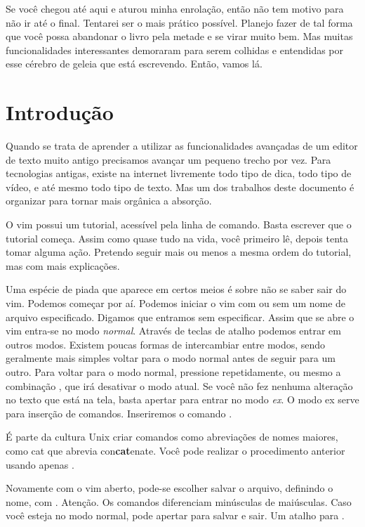 \documentclass[a4paper, 12pt]{article}
\begin{document}
Se você chegou até aqui e aturou minha enrolação, então não tem motivo para não ir até o final.
Tentarei ser o mais prático possível.
Planejo fazer de tal forma que você possa abandonar o livro pela metade e se virar muito bem.
Mas muitas funcionalidades interessantes demoraram para serem colhidas e entendidas por esse cérebro
de geleia que está escrevendo. Então, vamos lá.

\newpage

\section{Introdução}
Quando se trata de aprender a utilizar as funcionalidades avançadas de um editor de texto muito
antigo precisamos avançar um pequeno trecho por vez.
Para tecnologias antigas, existe na internet livremente todo tipo de dica,
todo tipo de vídeo, e até mesmo todo tipo de texto.
Mas um dos trabalhos deste documento é organizar para tornar mais orgânica a absorção.

O vim possui um tutorial, acessível pela linha de comando.
Basta escrever  que o tutorial começa.
Assim como quase tudo na vida, você primeiro lê, depois tenta tomar alguma ação.
Pretendo seguir mais ou menos a mesma ordem do tutorial, mas com mais explicações.

Uma espécie de piada que aparece em certos meios é sobre não se saber sair do vim.
Podemos começar por aí.
Podemos iniciar o vim com ou sem um nome de arquivo especificado.
Digamos que entramos sem especificar.
Assim que se abre o vim entra-se no modo \emph{normal}.
Através de teclas de atalho podemos entrar em outros modos.
Existem poucas formas de intercambiar entre modos, sendo geralmente mais simples voltar
para o modo normal antes de seguir para um outro.
Para voltar para o modo normal, pressione  repetidamente,
ou mesmo a combinação , que irá desativar o modo atual.
Se você não fez nenhuma alteração no texto que está na tela, basta apertar \vimcommand{:} para entrar no modo \emph{ex}.
O modo ex serve para inserção de comandos.
Inseriremos o comando .

É parte da cultura Unix criar comandos como abreviações de nomes maiores,
como cat que abrevia con\textbf{cat}enate.
Você pode realizar o procedimento anterior usando apenas .

Novamente com o vim aberto, pode-se escolher salvar o arquivo, definindo o nome, com .
Atenção. Os comandos diferenciam minúsculas de maiúsculas.
Caso você esteja no modo normal, pode apertar  para salvar e sair. Um atalho para .
\end{document}
